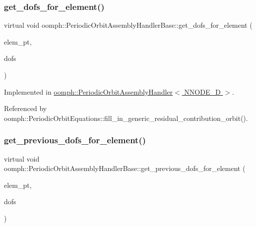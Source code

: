 \subsubsection{\texorpdfstring{get\+\_\+dofs\+\_\+for\+\_\+element()}{get\_dofs\_for\_element()}}
{\footnotesize\ttfamily virtual void oomph\+::\+Periodic\+Orbit\+Assembly\+Handler\+Base\+::get\+\_\+dofs\+\_\+for\+\_\+element (\begin{DoxyParamCaption}\item[{\hyperlink{classoomph_1_1GeneralisedElement}{Generalised\+Element} $\ast$const}]{elem\+\_\+pt,  }\item[{\hyperlink{classoomph_1_1Vector}{Vector}$<$ double $>$ \&}]{dofs }\end{DoxyParamCaption})\hspace{0.3cm}{\ttfamily [pure virtual]}}



Implemented in \hyperlink{classoomph_1_1PeriodicOrbitAssemblyHandler_a9e8d41c8ad79134466a1a50c11c62dc3}{oomph\+::\+Periodic\+Orbit\+Assembly\+Handler$<$ N\+N\+O\+D\+E\+\_\+D $>$}.



Referenced by oomph\+::\+Periodic\+Orbit\+Equations\+::fill\+\_\+in\+\_\+generic\+\_\+residual\+\_\+contribution\+\_\+orbit().

\mbox{\label{classoomph_1_1PeriodicOrbitAssemblyHandlerBase_a680c82526671e8213d317367f3f7a7e1}} 
\subsubsection{\texorpdfstring{get\+\_\+previous\+\_\+dofs\+\_\+for\+\_\+element()}{get\_previous\_dofs\_for\_element()}}
{\footnotesize\ttfamily virtual void oomph\+::\+Periodic\+Orbit\+Assembly\+Handler\+Base\+::get\+\_\+previous\+\_\+dofs\+\_\+for\+\_\+element (\begin{DoxyParamCaption}\item[{\hyperlink{classoomph_1_1GeneralisedElement}{Generalised\+Element} $\ast$const}]{elem\+\_\+pt,  }\item[{\hyperlink{classoomph_1_1Vector}{Vector}$<$ double $>$ \&}]{dofs }\end{DoxyParamCaption})\hspace{0.3cm}{\ttfamily [pure virtual]}}




